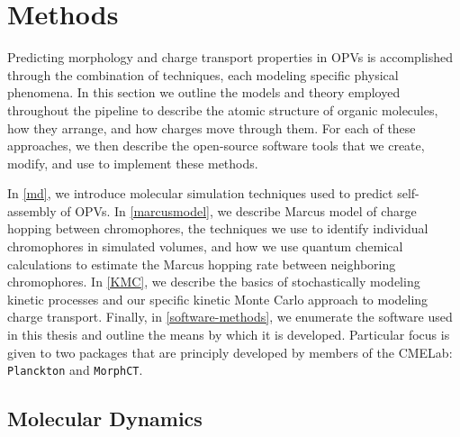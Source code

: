 \chapter{Methods}
\label{methods}

Predicting morphology and charge transport properties in OPVs is accomplished through the combination 
of techniques, each modeling specific physical phenomena.
In this section we outline the models and theory employed throughout the pipeline to describe 
the atomic structure of organic molecules, how they arrange, and how charges move through them. 
For each of these approaches, we then describe the open-source software tools that we create, modify, and use 
to implement these methods. 

In \autoref{md}, we introduce molecular simulation techniques used to predict self-assembly of OPVs.
In \autoref{marcusmodel}, we describe Marcus model of charge hopping between chromophores,
the techniques we use to identify individual chromophores in simulated volumes, 
and how we use quantum chemical calculations to estimate the Marcus hopping rate between
neighboring chromophores.
In \autoref{KMC}, we describe the basics of stochastically modeling kinetic processes and 
our specific kinetic Monte Carlo approach to modeling charge transport.
Finally, in \autoref{software-methods}, we enumerate the software used in this thesis and outline the means by
which it is developed. Particular focus is given to two packages that are principly developed by members of the CMELab:
\texttt{Planckton} and \texttt{MorphCT}.  
 

\section{Molecular Dynamics}

\label{md}

